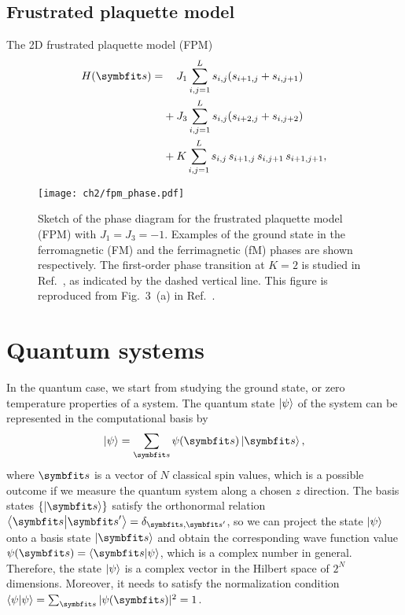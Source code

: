 \subsection{Frustrated plaquette model}

The 2D frustrated plaquette model (FPM)
\begin{align}
H(\vs) = &\phantom{{}+{}} J_1 \sum_{i, j = 1}^L s_{i, j} (s_{i + 1, j} + s_{i, j + 1}) \nonumber \\
&+ J_3 \sum_{i, j = 1}^L s_{i, j} (s_{i + 2, j} + s_{i, j + 2}) \nonumber \\
&+ K \sum_{i, j = 1}^L s_{i, j} \, s_{i + 1, j} \, s_{i, j + 1} \, s_{i + 1, j + 1},
\label{eq:fpm}
\end{align}

\begin{figure}[htb]
\centering
\texttt{[image: ch2/fpm\_phase.pdf]}
\caption[Phase diagram of frustrated plaquette model (FPM)]{
Sketch of the phase diagram for the frustrated plaquette model (FPM) with $J_1 = J_3 = -1$.
Examples of the ground state in the ferromagnetic (FM) and the ferrimagnetic (fM) phases are shown respectively.
The first-order phase transition at $K = 2$ is studied in Ref.~\cite{wu2021unbiased}, as indicated by the dashed vertical line.
This figure is reproduced from Fig.~3~(a) in Ref.~\cite{wu2021unbiased}.
}
\label{fig:fpm-phase}
\end{figure}

\section{Quantum systems}

In the quantum case, we start from studying the ground state, or zero temperature properties of a system. The quantum state $\ket{\psi}$ of the system can be represented in the computational basis by
\begin{equation}
\ket{\psi} = \sum_\vs \psi(\vs) \ket{\vs},
\end{equation}
where $\vs$ is a vector of $N$ classical spin values, which is a possible outcome if we measure the quantum system along a chosen $z$ direction. The basis states $\{\ket{\vs}\}$ satisfy the orthonormal relation $\ip{\vs}{\vs'} = \delta_{\vs, \vs'}$, so we can project the state $\ket{\psi}$ onto a basis state $\ket{\vs}$ and obtain the corresponding wave function value $\psi(\vs) = \ip{\vs}{\psi}$, which is a complex number in general. Therefore, the state $\ket{\psi}$ is a complex vector in the Hilbert space of $2^N$ dimensions. Moreover, it needs to satisfy the normalization condition $\ip{\psi}{\psi} = \sum_{\vs} |\psi(\vs)|^2 = 1$.

